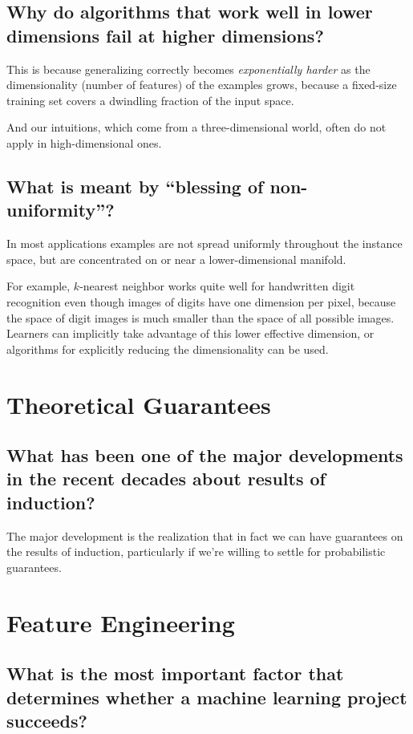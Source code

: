 \documentclass[10pt]{article}
\begin{document}
\subsection{Why do algorithms that work well in lower dimensions fail at higher
dimensions?}

This is because generalizing correctly becomes \emph{exponentially harder} as
the dimensionality (number of features) of the examples grows, because a
fixed-size training set covers a dwindling fraction of the input space.

And our intuitions, which come from a three-dimensional world, often do not
apply in high-dimensional ones.

\subsection{What is meant by ``blessing of non-uniformity''?}

In most applications examples are not spread uniformly throughout the instance
space, but are concentrated on or near a lower-dimensional manifold.

For example, $k$-nearest neighbor works quite well for handwritten digit
recognition even though images of digits have one dimension per pixel, because
the space of digit images is much smaller than the space of all possible
images. Learners can implicitly take advantage of this lower effective
dimension, or algorithms for explicitly reducing the dimensionality can be
used.

\section{Theoretical Guarantees}

\subsection*{What has been one of the major developments in the recent decades
about results of induction?}

The major development is the realization that in fact we can have guarantees on
the results of induction, particularly if we’re willing to settle for
probabilistic guarantees.

\section{Feature Engineering}

\subsection{What is the most important factor that determines whether a machine
learning project succeeds?}
\end{document}
